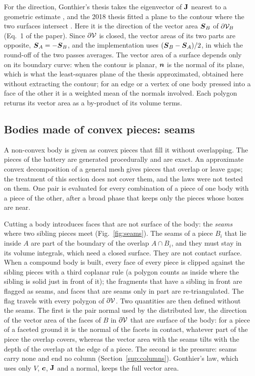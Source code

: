 For the direction, Gonthier's thesis takes the eigenvector of $\mathbf{J}$ nearest to a geometric
estimate \cite{Gonthier2007thesis}, and the 2018 thesis fitted a plane to the contour where the
two surfaces intersect \cite{Vilela2018}. Here it is the direction of the vector area
$\boldsymbol{S}_B$ of $\partial\mathcal{V}_B$ (Eq.~1 of the paper). Since $\partial\mathcal{V}$ is closed,
the vector areas of its two parts are opposite, $\boldsymbol{S}_A = -\boldsymbol{S}_B$, and the
implementation uses $(\boldsymbol{S}_B - \boldsymbol{S}_A)/2$, in which the round-off of the two passes
averages. The vector area of a surface depends only on its boundary curve: when the contour is
planar, $\boldsymbol{n}$ is the normal of its plane, which is what the least-squares plane of the thesis
approximated, obtained here without extracting the contour; for an edge or a vertex of one body
pressed into a face of the other it is a weighted mean of the normals involved. Each polygon
returns its vector area as a by-product of its volume terms.

\subsection{Bodies made of convex pieces: seams}

A non-convex body is given as convex pieces that fill it without overlapping. The pieces of the
battery are generated procedurally and are exact. An approximate convex decomposition of a
general mesh \cite{Wei2022coacd} gives pieces that overlap or leave gaps; the treatment of this
section does not cover them, and the laws were not tested on them. One pair is evaluated for
every combination of a piece of one body with a piece of the other, after a broad phase that
keeps only the pieces whose boxes are near.

Cutting a body introduces faces that are not surface of the body: the \emph{seams} where two
sibling pieces meet (Fig.~\ref{fig:seams}). The seams of a piece $B_i$ that lie inside $A$ are
part of the boundary of the overlap $A \cap B_i$, and they must stay in its volume integrals,
which need a closed surface. They are not contact surface. When a compound body is built, every
face of every piece is clipped against the sibling pieces with a third coplanar rule (a polygon
counts as inside where the sibling is solid just in front of it); the fragments that have a
sibling in front are flagged as seams, and faces that are seams only in part are
re-triangulated. The flag travels with every polygon of $\partial\mathcal{V}$. Two quantities are
then defined without the seams. The first is the pair normal used by the distributed law, the
direction of the vector area of the faces of $B$ in $\partial\mathcal{V}$ that are surface of the
body: for a piece of a faceted ground it is the normal of the facets in contact, whatever part of
the piece the overlap covers, whereas the vector area with the seams tilts with the depth of the
overlap at the edge of a piece. The second is the pressure: seams carry none and end no column
(Section~\ref{sup:columns}). Gonthier's law, which uses only $V$, $\boldsymbol{c}$, $\mathbf{J}$ and a
normal, keeps the full vector area.

